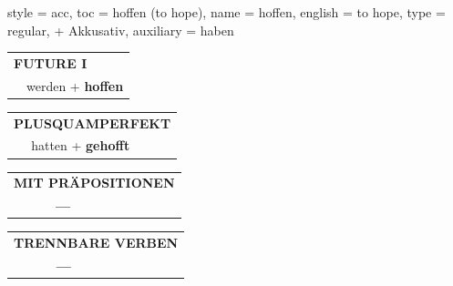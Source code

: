 \begin{verbentry}{
  style = {acc},
  toc = {hoffen (to hope)},
  name = {hoffen},
  english = {to hope},
  type = {regular, + Akkusativ},
  auxiliary = {haben}
}
\begin{tabular}{rl}
    \multicolumn{2}{l}{\textbf{FUTURE I} }\\
   & werden + \textbf{hoffen}\\
 
  \end{tabular}
\hfill
   \begin{tabular}{rl}
      \multicolumn{2}{l}{\textbf{PLUSQUAMPERFEKT}}\\
   & hatten + \textbf{gehofft}\\
  \end{tabular}
  
  
\vspace{10pt}

\begin{tabular}{lll}
\multicolumn{3}{l}{\textbf{MIT PRÄPOSITIONEN}}\\
& \textbf{---} & \\
\end{tabular}
\hfill
\begin{tabular}{lll}
\multicolumn{3}{l}{\textbf{TRENNBARE VERBEN}}\\
& \textbf{---} & \\
\end{tabular}
\vspace{-5pt}
\end{verbentry}


